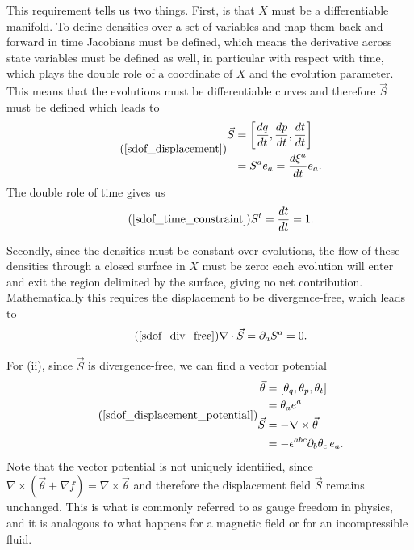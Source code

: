 \documentclass[10pt,twocolumn, nofootinbib]{revtex4-2}
\begin{document}
This requirement tells us two things. First, is that $X$ must be a differentiable manifold. To define densities over a set of variables and map them back and forward in time Jacobians must be defined, which means the derivative across state variables must be defined as well, in particular with respect with time, which plays the double role of a coordinate of $X$ and the evolution parameter. This means that the evolutions must be differentiable curves and therefore $\vec{S}$ must be defined which leads to
\begin{equation}
\tag*{(\ref{sdof_displacement})}
	\begin{aligned}
		\vec{S} &= \left[ \frac{dq}{dt},\frac{dp}{dt},\frac{dt}{dt} \right] \\
		&= S^a e_a = \frac{d\xi^a}{dt} e_a .
	\end{aligned}
\end{equation}
The double role of time gives us
\begin{equation}
\tag*{(\ref{sdof_time_constraint})}
 	S^t=\frac{dt}{dt}=1.
 \end{equation}

Secondly, since the densities must be constant over evolutions, the flow of these densities through a closed surface in $X$ must be zero: each evolution will enter and exit the region delimited by the surface, giving no net contribution. Mathematically this requires the displacement to be divergence-free, which leads to
\begin{equation}
\tag*{(\ref{sdof_div_free})}
	\nabla \cdot \vec{S} = \partial_a S^a = 0.
\end{equation}

For (ii), since $\vec{S}$ is divergence-free, we can find a vector potential
\begin{equation}
\tag*{(\ref{sdof_displacement_potential})}
	\begin{aligned}
		\vec{\theta} &= [\theta_q, \theta_p, \theta_t] \\
		&= \theta_a e^a \\
		\vec{S} &= - \nabla \times \vec{\theta} \\
		&= - \epsilon^{abc} \partial_b \theta_c \, e_a. \\
	\end{aligned}
\end{equation}
Note that the vector potential is not uniquely identified, since $\nabla \times(\vec{\theta} + \nabla f) = \nabla \times \vec{\theta}$ and therefore the displacement field $\vec{S}$ remains unchanged. This is what is commonly referred to as gauge freedom in physics, and it is analogous to what happens for a magnetic field or for an incompressible fluid.
\end{document}

